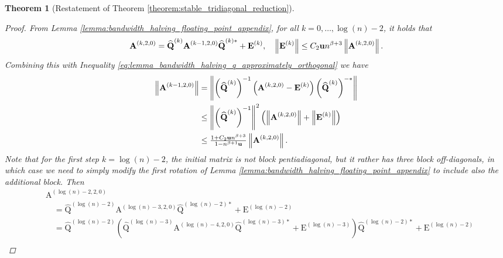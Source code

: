\documentclass{article}
\newcommand{\lnorm}{\left\|}
\newcommand{\rnorm}{\right\|}
\newcommand{\lpar}{\left(}
\newcommand{\rpar}{\right)}
\newtheorem{theorem}{Theorem}[section]
\newcommand\matA{\boldsymbol{\mathrm{A}}}
\newcommand\matE{\boldsymbol{\mathrm{E}}}
\newcommand\matQhat{\widehat{\boldsymbol{\mathrm{Q}}}}
\newcommand{\umach}{\textbf{\textup{u}}}
\newcommand{\cmm}{\beta}
\begin{document}
\begin{theorem}[Restatement of Theorem \ref{theorem:stable_tridiagonal_reduction}]
\begin{proof}
        From Lemma \ref{lemma:bandwidth_halving_floating_point_appendix}, for all $k=0,\ldots,\log(n)-2$, it holds that
        \begin{align*}
            \matA^{(k,2,0)}= \matQhat^{(k)}\matA^{(k-1,2,0)}\matQhat^{(k)*} + \matE^{(k)}, \quad \lnorm 
            \matE^{(k)}
            \rnorm
            \leq
            C_2\umach n^{\cmm+3}\lnorm\matA^{(k,2,0)}\rnorm.
        \end{align*}
        Combining this with Inequality \eqref{eq:lemma_bandwidth_halving_q_approximately_orthogonal} we have
        \begin{align*}
            \lnorm
                \matA^{(k-1,2,0)}
            \rnorm
            &=
            \lnorm
                \lpar \matQhat^{(k)} \rpar^{-1}
                \lpar
                    \matA^{(k,2,0)}
                    -
                    \matE^{(k)}
                \rpar
                \lpar\matQhat^{(k)}\rpar^{-*}
            \rnorm
            \\
            &\leq
            \lnorm
                \lpar \matQhat^{(k)}\rpar^{-1}
            \rnorm^2
            \lpar
                \lnorm
                    \matA^{(k,2,0)}
                \rnorm
                +
                \lnorm
                    \matE^{(k)}
                \rnorm
            \rpar
            \\
            &\leq
            \tfrac{1+C_2\umach n^{\cmm+3}}{1-n^{\cmm+1} \umach}
                \lnorm
                    \matA^{(k,2,0)}
                \rnorm.
        \end{align*}
        Note that for the first step $k=\log(n)-2$, the initial matrix is not block pentiadiagonal, but it rather has three block off-diagonals, in which case we need to simply modify the first rotation of Lemma \ref{lemma:bandwidth_halving_floating_point_appendix} to include also the additional block. 
        Then
        \begin{align*}
            &\matA^{(\log(n)-2,2,0)}
            \\
            &\quad=
            \matQhat^{(\log(n)-2)}\matA^{(\log(n)-3,2,0)}\matQhat^{(\log(n)-2)*} + \matE^{(\log(n)-2)}
            \\
            &\quad=
            \matQhat^{(\log(n)-2)}\lpar
            \matQhat^{(\log(n)-3)}
            \matA^{(\log(n)-4,2,0)}
            \matQhat^{(\log(n)-3)*} 
            + 
            \matE^{(\log(n)-3)}
            \rpar\matQhat^{(\log(n)-2)*} + \matE^{(\log(n)-2)}
            \\

\end{align*}
\end{proof}
\end{theorem}
\end{document}
